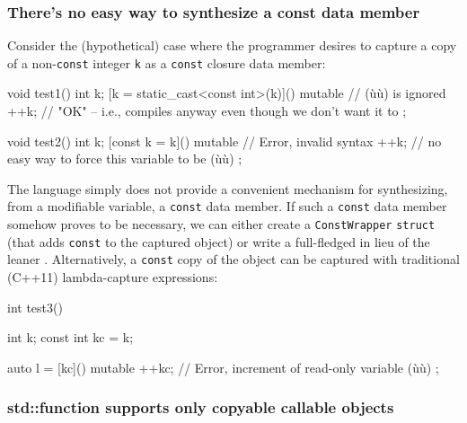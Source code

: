 \subsubsection[There’s no easy way to synthesize a \lstinline!const! data member]{There’s no easy way to synthesize a {\SubsubsecCode const} data member}\label{there’s-no-easy-way-to-synthesize-a-const-data-member}

Consider the (hypothetical) case where the programmer desires to capture
a copy of a non-\lstinline!const! integer \lstinline!k! as a \lstinline!const!
closure data member:

\begin{emcppslisting}[emcppsstandards={c++14}]
void test1()
{
    int k;
    [k = static_cast<const int>(k)]() mutable  // (ù{}ù) is ignored
    {
        ++k;  // "OK" -- i.e., compiles anyway even though we don't want it to
    };
}
\end{emcppslisting}

\begin{emcppslisting}[emcppsstandards={c++14}]
void test2()
{
    int k;
    [const k = k]() mutable  // Error, invalid syntax
    {
        ++k;  // no easy way to force this variable to be (ù{}ù)
    };
}
\end{emcppslisting}

\noindent The language simply does not provide a convenient mechanism for
synthesizing, from a modifiable variable, a \lstinline!const! data member.
If such a \lstinline!const! data member somehow proves to be necessary, we
can either create a \lstinline!ConstWrapper! \lstinline!struct! (that adds
\lstinline!const! to the captured object) or write a full-fledged
 in lieu of the leaner . Alternatively, a \lstinline!const! copy of the object can be
captured with traditional (C++11) lambda-capture expressions:

\begin{emcppslisting}
int test3()
{
    int k;
    const int kc = k;

    auto l = [kc]() mutable
    {
        ++kc;  // Error, increment of read-only variable (ù{}ù)
    };
}
\end{emcppslisting}


\subsubsection[\lstinline!std::function! supports only copyable callable objects]{{\SubsubsecCode std::function} supports only copyable callable objects}\label{std::function-supports-only-copyable-callable-objects}

